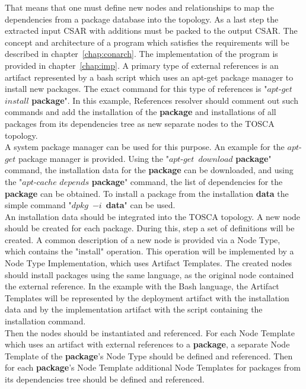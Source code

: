 That means that one must define new nodes and relationships to map the dependencies from a package database into the topology.
As a last step the extracted input CSAR with additions must be packed to the output CSAR.
The concept and architecture of a program which satisfies the requirements will be described in chapter~\ref{chap:conarch}.
The implementation of the program is provided in chapter~\ref{chap:imp}.
A primary type of external references is an artifact represented by a bash script which uses an apt-get package manager to install new packages.
The exact command for this type of references is "$apt$-$get$~$install$ \textbf{package}".
In this example, References resolver should comment out such commands and add the installation of the \textbf{package} and installations of all packages from its dependencies tree as new separate nodes to the TOSCA topology. \\
A system package manager can be used for this purpose. 
An example for the $apt$-$get$ package manager is provided. 
Using the "$apt$-$get$~$download$ \textbf{package}" command, the installation data for the \textbf{package} can be downloaded, and using the "$apt$-$cache$ $depends$ \textbf{package}" command, the list of dependencies for the \textbf{package} can be obtained. 
To install a package from the installation \textbf{data} the simple command "$dpkg$~$-i$~\textbf{data}" can be used.\\
An installation data should be integrated into the TOSCA topology. 
A new node should be created for each package. 
During this, step a set of definitions will be created.
A common description of a new node is provided via a Node Type, which contains the "install" operation. 
This operation will be implemented by a Node Type Implementation, which uses Artifact Templates.
The created nodes should install packages using the same language, as the original node contained the external reference.
In the example with the Bash language, the Artifact Templates will be represented by the deployment artifact with the installation data and by the implementation artifact with the script containing the installation command. \\
Then the nodes should be instantiated and referenced.
For each Node Template which uses an artifact with external references to a \textbf{package}, a separate Node Template of the \textbf{package}'s Node Type should be defined and referenced.
Then for each \textbf{package}'s Node Template additional Node Templates for packages from its dependencies tree should be defined and referenced.

